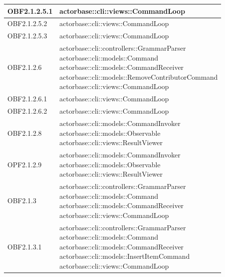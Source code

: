 \documentclass{scalatekids-article}
\begin{document}
\begin{longtable}[H]{|p{5cm}|p{12cm}|}
\hline
OBF2.1.2.5.1 & \multiLineCell[t]{actorbase::cli::views::CommandLoop\\}\\
\hline
OBF2.1.2.5.2 & \multiLineCell[t]{actorbase::cli::views::CommandLoop\\}\\
\hline
OBF2.1.2.5.3 & \multiLineCell[t]{actorbase::cli::views::CommandLoop\\}\\
\hline
OBF2.1.2.6 & \multiLineCell[t]{actorbase::cli::controllers::GrammarParser\\actorbase::cli::models::Command\\actorbase::cli::models::CommandReceiver\\actorbase::cli::models::RemoveContributorCommand\\actorbase::cli::views::CommandLoop\\}\\
\hline
OBF2.1.2.6.1 & \multiLineCell[t]{actorbase::cli::views::CommandLoop\\}\\
\hline
OBF2.1.2.6.2 & \multiLineCell[t]{actorbase::cli::views::CommandLoop\\}\\
\hline
OBF2.1.2.8 & \multiLineCell[t]{actorbase::cli::models::CommandInvoker\\actorbase::cli::models::Observable\\actorbase::cli::views::ResultViewer\\}\\
\hline
OPF2.1.2.9 & \multiLineCell[t]{actorbase::cli::models::CommandInvoker\\actorbase::cli::models::Observable\\actorbase::cli::views::ResultViewer\\}\\
\hline
OBF2.1.3 & \multiLineCell[t]{actorbase::cli::controllers::GrammarParser\\actorbase::cli::models::Command\\actorbase::cli::models::CommandReceiver\\actorbase::cli::views::CommandLoop\\}\\
\hline
OBF2.1.3.1 & \multiLineCell[t]{actorbase::cli::controllers::GrammarParser\\actorbase::cli::models::Command\\actorbase::cli::models::CommandReceiver\\actorbase::cli::models::InsertItemCommand\\actorbase::cli::views::CommandLoop\\}\\

\end{longtable}
\end{document}
